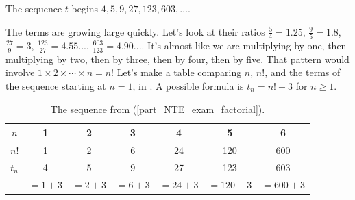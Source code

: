 \begin{exam}
\begin{apart}
            \item \label{part_NTE_exam_factorial} The sequence $t$ begins $4, 5, 9, 27, 123, 603, \ldots$. 
                \begin{soln}
                    The terms are growing large quickly.  Let's look at their ratios $\frac{5}{4} = 1.25$, $\frac{9}{5} = 1.8$, $\frac{27}{9}=3$, $\frac{123}{27} = 4.55...$, $\frac{603}{123} = 4.90...$.  It's almost like we are multiplying by one, then multiplying by two, then by three, then by four, then by five.  That pattern would involve $1 \times 2 \times \cdots \times n =n!$ Let's make a table comparing $n$, $n!$, and the terms of the sequence starting at $n=1$, in . A possible formula is $t_n = n!+3$ for $n \ge 1$.
                \end{soln}
                \begin{table}[hbtp]
                    \centering
                    \begin{tabular}{c|c|c| c|c|c| c}
                        $n$ & 1 & 2 & 3 & 4 & 5 & 6 \\ \hline
                        $n!$ & 1 & 2 & 6 & 24 & 120 & 600\\ \hline
                        $t_n$ & 4 & 5 & 9 & 27 & 123 & 603\\
                        & $=1+3$ & $=2+3$ & $=6+3$ & $=24+3$ & $=120+3$ & $=600+3$
                    \end{tabular}
                    \caption{The sequence from  (\ref{part_NTE_exam_factorial}).}
                    \label{tab_NTE_exam_factorial}
                \end{table}
            

\end{apart}
\end{exam}
